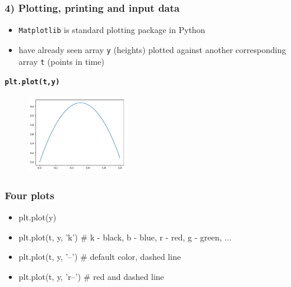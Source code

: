 \documentclass[14pt]{beamer}
\newcommand\blue[1]{{\color{blue} #1}}
\begin{document}
\begin{frame}[fragile]
\frametitle{4) Plotting, printing and input data}

\begin{itemize}
\item \texttt{Matplotlib} is standard plotting package in Python
\item have already seen array \texttt{y} (heights) plotted against another corresponding array \texttt{t} (points in time) 
\end{itemize}
\vspace*{-6mm}
\begin{center}
{\small\blue{
\textbf{
\texttt{plt.plot(t,y)}}}
}
\end{center}
\vspace*{-8mm}
\begin{figure}[ht]
	\centering
	\includegraphics[width=0.4\textwidth]{figures/LLp22a}
\end{figure}

\end{frame}


\begin{frame}[fragile]
\frametitle{Four plots}
\begin{itemize}
\item plt.plot(y)
\item plt.plot(t, y, ’k’) \# k - black, b - blue, r - red, g - green, ...
\item plt.plot(t, y, ’--’) \# default color, dashed line
\item plt.plot(t, y, ’r--’) \# red and dashed line
\end{itemize}

\end{frame}

\end{document}
